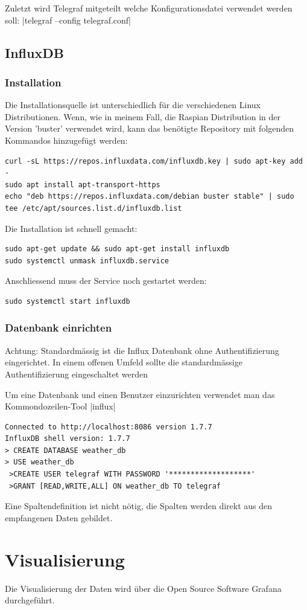 \documentclass[
  12pt, %
  a4paper, %
  twoside, %
  openany, %
  numbers=noenddot, %
  BCOR=5mm, %
  parskip=half*, %
  thesis, %
]{bfhbook}
\begin{document}
Zuletzt wird Telegraf mitgeteilt welche Konfigurationsdatei verwendet werden soll: |telegraf --config telegraf.conf|
\subsection{InfluxDB}
   \subsubsection{Installation}
   Die Installationsquelle ist unterschiedlich für die verschiedenen Linux Distributionen. Wenn, wie in meinem Fall, die Raspian Distribution in der Version 'buster' verwendet wird, kann das benötigte Repository mit folgenden Kommandos hinzugefügt werden:
 \begin{verbatim}
curl -sL https://repos.influxdata.com/influxdb.key | sudo apt-key add -
sudo apt install apt-transport-https
echo "deb https://repos.influxdata.com/debian buster stable" | sudo tee /etc/apt/sources.list.d/influxdb.list
\end{verbatim}
Die Installation ist schnell gemacht:
 \begin{verbatim}
sudo apt-get update && sudo apt-get install influxdb
sudo systemctl unmask influxdb.service
   \end{verbatim}
   Anschliessend muss der Service noch gestartet werden:
    \begin{verbatim}
sudo systemctl start influxdb
   \end{verbatim}
   \subsubsection{Datenbank einrichten}
{\color{red}Achtung: Standardmässig ist die Influx Datenbank ohne Authentifizierung eingerichtet. In einem offenen Umfeld sollte die standardmässige Authentifizierung eingeschaltet werden \cite{influxAuth}}

Um eine Datenbank und einen Benutzer einzurichten verwendet man das Kommondozeilen-Tool |influx|
 \begin{verbatim}
Connected to http://localhost:8086 version 1.7.7
InfluxDB shell version: 1.7.7
> CREATE DATABASE weather_db
> USE weather_db
 >CREATE USER telegraf WITH PASSWORD '*******************'
 >GRANT [READ,WRITE,ALL] ON weather_db TO telegraf
 \end{verbatim}
 Eine Spaltendefinition ist nicht nötig, die Spalten werden direkt aus den empfangenen Daten gebildet.
\section{Visualisierung}
Die Visualisierung der Daten wird über die Open Source Software Grafana \cite{grafana} durchgeführt.
\end{document}
